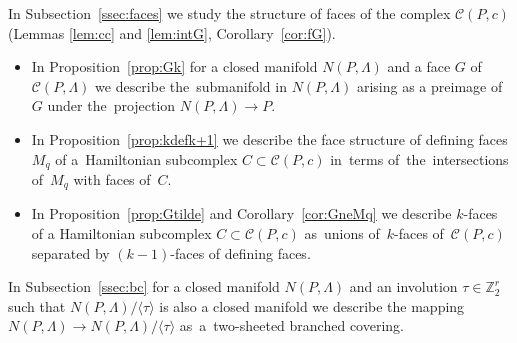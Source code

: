 \documentclass[12pt]{amsart}
\theoremstyle{definition}
\theoremstyle{remark}
\begin{document}
In Subsection~\ref{ssec:faces} we study the structure of faces of the complex $\mathcal{C}(P,c)$ 
(Lemmas \ref{lem:cc} and \ref{lem:intG}, Corollary~\ref{cor:fG}). 
\begin{itemize}
\item In Proposition~\ref{prop:Gk} for a closed
manifold $N(P,\Lambda)$ and a face $G$ of~$\mathcal{C}(P,\Lambda)$ we describe 
the~submanifold in $N(P,\Lambda)$ arising as a preimage of $G$ under the~projection $N(P,\Lambda)\to P$. 
\item In Proposition~\ref{prop:kdefk+1} we describe the face structure of defining faces $M_q$ of a~Hamiltonian subcomplex
$C\subset \mathcal{C}(P,c)$ in~terms of~the~intersections of~$M_q$ with faces of~$C$.
\item  In Proposition~\ref{prop:Gtilde}
and Corollary~\ref{cor:GneMq} we describe $k$-faces of a Hamiltonian subcomplex $C\subset \mathcal{C}(P,c)$ 
as~unions of~$k$-faces of~$\mathcal{C}(P,c)$ separated by $(k-1)$-faces of defining faces.  
\end{itemize}

In Subsection~\ref{ssec:bc} for a closed manifold $N(P,\Lambda)$ and an involution
$\tau\in\mathbb Z_2^r$ such that $N(P,\Lambda)/\langle\tau\rangle$ is also a closed manifold
we describe the mapping $N(P,\Lambda)\to N(P,\Lambda)/\langle\tau\rangle$ as~a~two-sheeted branched covering.
\end{document}
